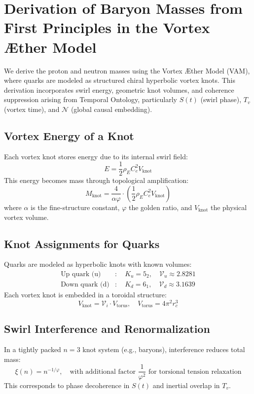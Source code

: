 
\section{Derivation of Baryon Masses from First Principles in the Vortex \AE{}ther Model}

We derive the proton and neutron masses using the Vortex \AE{}ther Model (VAM), where quarks are modeled as structured chiral hyperbolic vortex knots. This derivation incorporates swirl energy, geometric knot volumes, and coherence suppression arising from Temporal Ontology, particularly $S(t)$ (swirl phase), $T_v$ (vortex time), and $\mathcal{N}$ (global causal embedding).

\subsection{Vortex Energy of a Knot}
Each vortex knot stores energy due to its internal swirl field:
\[
E = \frac{1}{2} \rho_{\scriptscriptstyle\boldsymbol\!E}C_e^2 V_{\text{knot}}
\]
This energy becomes mass through topological amplification:
\[
\boxed{
M_{\text{knot}} = \frac{4}{\alpha \varphi} \cdot \left( \frac{1}{2} \rho_{\scriptscriptstyle\boldsymbol\!E}C_e^2 V_{\text{knot}} \right)
}
\]
where $\alpha$ is the fine-structure constant, $\varphi$ the golden ratio, and $V_{\text{knot}}$ the physical vortex volume.

\subsection{Knot Assignments for Quarks}
Quarks are modeled as hyperbolic knots with known volumes:
\[
\begin{aligned}
\text{Up quark (u)} &: \quad K_u = 5_2, \quad \mathcal{V}_u \approx 2.8281 \\
\text{Down quark (d)} &: \quad K_d = 6_1, \quad \mathcal{V}_d \approx 3.1639
\end{aligned}
\]
Each vortex knot is embedded in a toroidal structure:
\[
V_{\text{knot}} = \mathcal{V}_i \cdot V_{\text{torus}}, \quad V_{\text{torus}} = 4\pi^2 r_c^3
\]

\subsection{Swirl Interference and Renormalization}
In a tightly packed $n=3$ knot system (e.g., baryons), interference reduces total mass:
\[
\xi(n) = n^{-1/\varphi}, \quad \text{with additional factor } \frac{1}{\varphi^2} \text{ for torsional tension relaxation}
\]
This corresponds to phase decoherence in $S(t)$ and inertial overlap in $T_v$.

